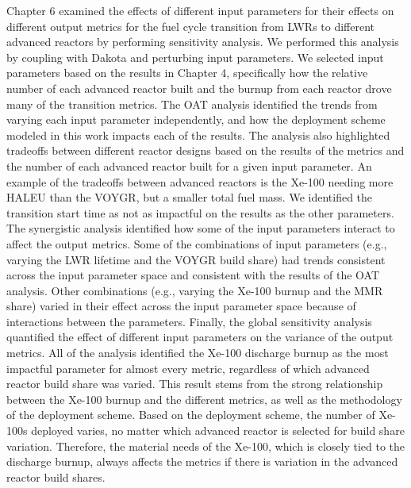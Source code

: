 Chapter 6 examined the effects of different input parameters for 
their effects on different output metrics for the fuel cycle transition from 
\glspl{LWR} to different advanced reactors by performing sensitivity 
analysis. We performed this analysis by coupling \Cyclus with Dakota 
and perturbing input parameters. We selected input parameters based 
on the results in Chapter 4, specifically how the 
relative number of each advanced reactor built and the burnup from 
each reactor drove many of the transition metrics. 
The \acrfull{OAT} analysis identified the 
trends from varying each input parameter independently, and how the deployment 
scheme modeled in this work impacts each of the results. The analysis also 
highlighted tradeoffs between different reactor designs based on 
the results of the metrics and the number of each advanced reactor 
built for a given input parameter. An example of the tradeoffs between 
advanced reactors is the Xe-100 
needing more \gls{HALEU} than the VOYGR, but a smaller total fuel mass. We identified 
the transition start time as not as impactful on 
the results as the other parameters. The synergistic 
analysis identified how some of the input parameters interact to affect the output 
metrics. Some of the combinations of input parameters (e.g., varying 
the \gls{LWR} lifetime and the VOYGR build share) had trends consistent 
across the input parameter space and consistent with the results of 
the \gls{OAT} analysis. Other combinations (e.g., varying the Xe-100 
burnup and the \gls{MMR} share) varied in their effect across the input parameter 
space because of interactions between the parameters. Finally, the global 
sensitivity analysis quantified the effect of different input parameters 
on the variance of the output metrics. All of the analysis 
identified the Xe-100 discharge burnup as the most impactful parameter
for almost every metric, regardless of which advanced reactor build share 
was varied. This result stems from the strong relationship between 
the Xe-100 burnup and the different metrics, as well as the methodology 
of the deployment scheme. Based on the deployment scheme, the number of 
Xe-100s deployed varies, no matter which advanced reactor is selected for 
build share variation. Therefore, the material needs of the 
Xe-100, which is closely tied to the discharge burnup, always 
affects the metrics if there is variation in the advanced reactor 
build shares. 


